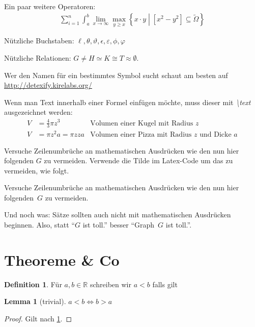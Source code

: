 \documentclass[a4paper,titlepage,twocolumn,oneside,12pt,ngerman,titlepage=firstiscover]{scrbook}
\theoremstyle{plain} %
\newtheorem{lemma}[theorem]{Lemma}
\theoremstyle{definition} %
\newtheorem{definition}[theorem]{Definition}
\theoremstyle{remark} %
\theoremstyle{plain}
\newcommand{\RR}{\mathbb{R}} %
\begin{document}
Ein paar weitere Operatoren:
\begin{align*}
\sum_{i=1}^n \int_a^b \lim_{x \to \infty} \max_{y \geq x} \left\{ x \cdot y \middle| \left[ x^2 - y^2 \right] \subseteq \tilde{\Omega} \right\}
\end{align*}

Nützliche Buchstaben: $\ell, \theta, \vartheta, \epsilon, \varepsilon, \phi, \varphi$

Nützliche Relationen: $G \neq H \simeq K \cong T \approx \emptyset$.

Wer den Namen für ein bestimmtes Symbol sucht schaut am besten auf \url{http://detexify.kirelabs.org/}

Wenn man Text innerhalb einer Formel einfügen möchte, muss dieser mit \textit{\textbackslash text} ausgezeichnet werden:
\begin{align*}
V &= \frac{4}{3} \pi z^3 & \text{Volumen einer Kugel mit Radius $z$}\\
V &= \pi z^2 a = \pi zza & \text{Volumen einer Pizza mit Radius $z$ und Dicke $a$}
\end{align*}

Versuche Zeilenumbrüche an mathematischen Ausdrücken wie den nun hier folgenden $G$ zu vermeiden. 
Verwende die Tilde im Latex-Code um das zu vermeiden, wie folgt.

Versuche Zeilenumbrüche an mathematischen Ausdrücken wie den nun hier folgenden~$G$ zu vermeiden. 

Und noch was: Sätze sollten auch nicht mit mathematischen Ausdrücken beginnen.
Also, statt \enquote{$G$ ist toll.} besser \enquote{Graph~$G$ ist toll.}.


\section{Theoreme \& Co}


\begin{definition}\label{def:smaller}
Für $a, b \in \RR$ schreiben wir $a < b$ falls gilt
\end{definition}

\begin{lemma}[trivial]\label{thm:trivial}
	$a < b \iff b > a$
\end{lemma}
\begin{proof}
Gilt nach \cref{def:smaller}.
\end{proof}
\end{document}
